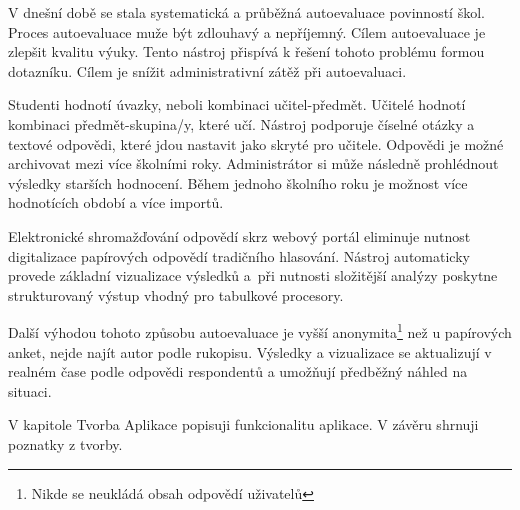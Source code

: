 V dnešní době se stala systematická a průběžná autoevaluace povinností škol.
Proces autoevaluace muže být zdlouhavý a nepříjemný. Cílem autoevaluace je zlepšit kvalitu výuky.\cite{sbornik-autoevaluace} 
Tento nástroj přispívá k řešení tohoto problému formou dotazníku.
Cílem je snížit administrativní zátěž při autoevaluaci.

Studenti hodnotí úvazky, neboli kombinaci učitel-předmět. 
Učitelé hodnotí kombinaci předmět-skupina/y, které učí. 
Nástroj podporuje číselné otázky a textové odpovědi, které jdou nastavit jako skryté pro učitele.
Odpovědi je možné archivovat mezi více školními roky. Administrátor si může následně prohlédnout výsledky starších hodnocení. 
Během jednoho školního roku je možnost více hodnotících období a více importů.

Elektronické shromažďování odpovědí skrz webový portál eliminuje nutnost digitalizace papírových odpovědí tradičního hlasování. 
Nástroj automaticky provede základní vizualizace výsledků a~při nutnosti složitější analýzy poskytne strukturovaný výstup vhodný pro tabulkové procesory.

Další výhodou tohoto způsobu autoevaluace je vyšší anonymita\footnote{Nikde se neukládá obsah odpovědí uživatelů} než u papírových anket, nejde najít autor podle rukopisu. 
Výsledky a vizualizace se aktualizují v realném čase podle odpovědi respondentů a umožňují předběžný náhled na situaci.

V kapitole Tvorba Aplikace popisuji funkcionalitu aplikace. V závěru shrnuji poznatky z tvorby.
